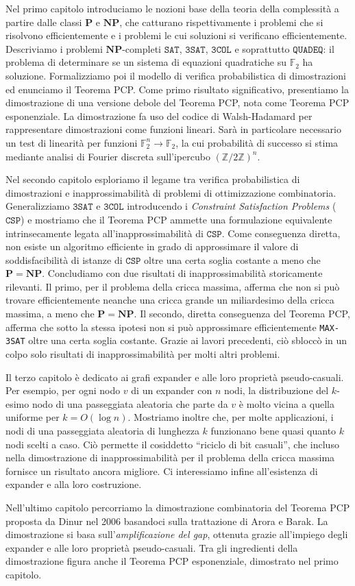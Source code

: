 \documentclass[12pt]{article}
\newcommand{\Z}{\mathbb{Z}}
\newcommand{\CSP}{\mathtt{CSP}\xspace}
\renewcommand{\P}{\mathbf{P}\xspace}
\newcommand{\NP}{\mathbf{NP}\xspace}
\newcommand{\F}{\mathbb{F}}
\begin{document}
Nel primo capitolo introduciamo le nozioni base della teoria della
complessità a partire dalle classi $\P$ e $\NP$, che catturano
rispettivamente i problemi che si risolvono efficientemente e i problemi le cui
soluzioni si verificano efficientemente.
Descriviamo i problemi $\NP$-completi $\mathtt{SAT}$, $\mathtt{3SAT}$,
$\mathtt{3COL}$ e soprattutto $\mathtt{QUADEQ}$: il problema di determinare se
un sistema di equazioni quadratiche su $\F_2$ ha soluzione.
Formalizziamo poi il modello di verifica probabilistica di dimostrazioni ed
enunciamo il Teorema PCP.
Come primo risultato significativo, presentiamo la dimostrazione di una versione
debole del Teorema PCP, nota come Teorema PCP esponenziale.
La dimostrazione fa uso del codice di Walsh-Hadamard per rappresentare
dimostrazioni come funzioni lineari. Sarà in particolare necessario un test di
linearità per funzioni $\F_2^n \to \F_2$, la cui probabilità di successo si
stima mediante analisi di Fourier discreta sull'ipercubo
$(\Z / 2\Z)^n$.

Nel secondo capitolo esploriamo il legame tra verifica probabilistica
di dimostrazioni e inapprossimabilità di problemi di ottimizzazione
combinatoria. Generalizziamo $\mathtt{3SAT}$ e $\mathtt{3COL}$ introducendo
i \emph{Constraint Satisfaction Problems} ($\mathtt{CSP}$) e mostriamo che il
Teorema PCP ammette una formulazione equivalente intrinsecamente legata
all'inapprossimabilità di $\CSP$.
Come conseguenza diretta, non esiste un algoritmo efficiente in grado di
approssimare il valore di soddisfacibilità di istanze di $\CSP$ oltre una
certa soglia costante a meno che $\P = \NP$.
Concludiamo con due risultati di inapprossimabilità storicamente rilevanti.
Il primo, per il problema della cricca massima, afferma che non si può trovare
efficientemente neanche una cricca grande un miliardesimo della cricca massima,
a meno che $\P = \NP$.
Il secondo, diretta conseguenza del Teorema PCP, afferma che sotto la stessa
ipotesi non si può approssimare efficientemente \texttt{MAX-3SAT} oltre una
certa soglia costante.
Grazie ai lavori precedenti, ciò sbloccò in un colpo solo risultati di
inapprossimabilità per molti altri problemi.

Il terzo capitolo è dedicato ai grafi expander e alle loro proprietà
pseudo-casuali. Per esempio, per ogni nodo $v$ di un expander con $n$ nodi,
la distribuzione del $k$-esimo nodo di una passeggiata aleatoria che parte da
$v$ è molto vicina a quella uniforme per $k = O(\log n)$.
Mostriamo inoltre che, per molte applicazioni, i nodi di una passeggiata
aleatoria di lunghezza $k$ funzionano bene quasi quanto $k$ nodi scelti a caso.
Ciò permette il cosiddetto ``riciclo di bit casuali'', che incluso nella
dimostrazione di inapprossimabilità per il problema della cricca massima
fornisce un risultato ancora migliore.
Ci interessiamo infine all'esistenza di expander e alla loro costruzione.

Nell'ultimo capitolo percorriamo la dimostrazione combinatoria
del Teorema PCP proposta da Dinur nel 2006 basandoci sulla trattazione di
Arora e Barak.
La dimostrazione si basa sull'\emph{amplificazione del gap}, ottenuta grazie
all'impiego degli expander e alle loro proprietà pseudo-casuali.
Tra gli ingredienti della dimostrazione figura anche il Teorema PCP
esponenziale, dimostrato nel primo capitolo.
\end{document}
